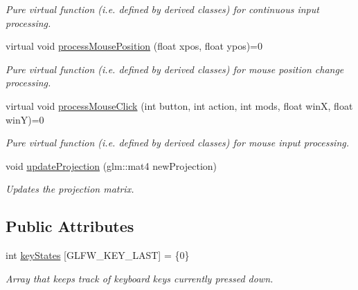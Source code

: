 \begin{DoxyCompactItemize}
\begin{DoxyCompactList}\small\item\em Pure virtual function (i.\+e. defined by derived classes) for continuous input processing. \end{DoxyCompactList}\item 
virtual void \hyperlink{class_environment_a6a5f1ed78138fb882a06081992c8b34a}{process\+Mouse\+Position} (float xpos, float ypos)=0
\begin{DoxyCompactList}\small\item\em Pure virtual function (i.\+e. defined by derived classes) for mouse position change processing. \end{DoxyCompactList}\item 
virtual void \hyperlink{class_environment_ae4d9f0521de194cbfd8894d97bd4cfa9}{process\+Mouse\+Click} (int button, int action, int mods, float winX, float winY)=0
\begin{DoxyCompactList}\small\item\em Pure virtual function (i.\+e. defined by derived classes) for mouse input processing. \end{DoxyCompactList}\item 
void \hyperlink{class_environment_a46e963ec1448396e116809558774ea83}{update\+Projection} (glm\+::mat4 new\+Projection)
\begin{DoxyCompactList}\small\item\em Updates the projection matrix. \end{DoxyCompactList}\end{DoxyCompactItemize}
\subsection*{Public Attributes}
\begin{DoxyCompactItemize}
\item 
int \hyperlink{class_environment_adb416d41b33612a7aeb2cd6a7aa46952}{key\+States} \mbox{[}G\+L\+F\+W\+\_\+\+K\+E\+Y\+\_\+\+L\+A\+ST\mbox{]} = \{0\}\hypertarget{class_environment_adb416d41b33612a7aeb2cd6a7aa46952}{}\label{class_environment_adb416d41b33612a7aeb2cd6a7aa46952}

\begin{DoxyCompactList}\small\item\em Array that keeps track of keyboard keys currently pressed down. \end{DoxyCompactList}\end{DoxyCompactItemize}
